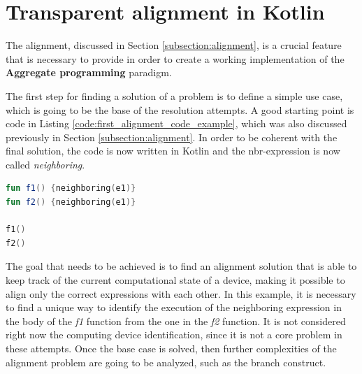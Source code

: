\chapter{Transparent alignment in Kotlin}\label{chapter:alignment}
The alignment, discussed in Section \ref{subsection:alignment}, is a crucial feature that is necessary to provide in order to create a working implementation of the \textbf{Aggregate programming} paradigm. 

The first step for finding a solution of a problem is to define a simple use case, which is going to be the base of the resolution attempts. A good starting point is code in Listing \ref{code:first_alignment_code_example}, which was also discussed previously in Section \ref{subsection:alignment}. In order to be coherent with the final solution, the code is now written in Kotlin and the nbr-expression is now called \textit{neighboring}.
\begin{lstlisting}[caption={Starting point code to resolve the alignment problem}, captionpos=b, language=Kotlin, label={code:first_alignment_code_example}]
fun f1() {neighboring(e1)}
fun f2() {neighboring(e1)}
        
f1()
f2()
\end{lstlisting}
The goal that needs to be achieved is to find an alignment solution that is able to keep track of the current computational state of a device, making it possible to align only the correct expressions with each other. In this example, it is necessary to find a unique way to identify the execution of the neighboring expression in the body of the \textit{f1} function from the one in the \textit{f2} function.\newline
It is not considered right now the computing device identification, since it is not a core problem in these attempts. Once the base case is solved, then further complexities of the alignment problem are going to be analyzed, such as the branch construct.

